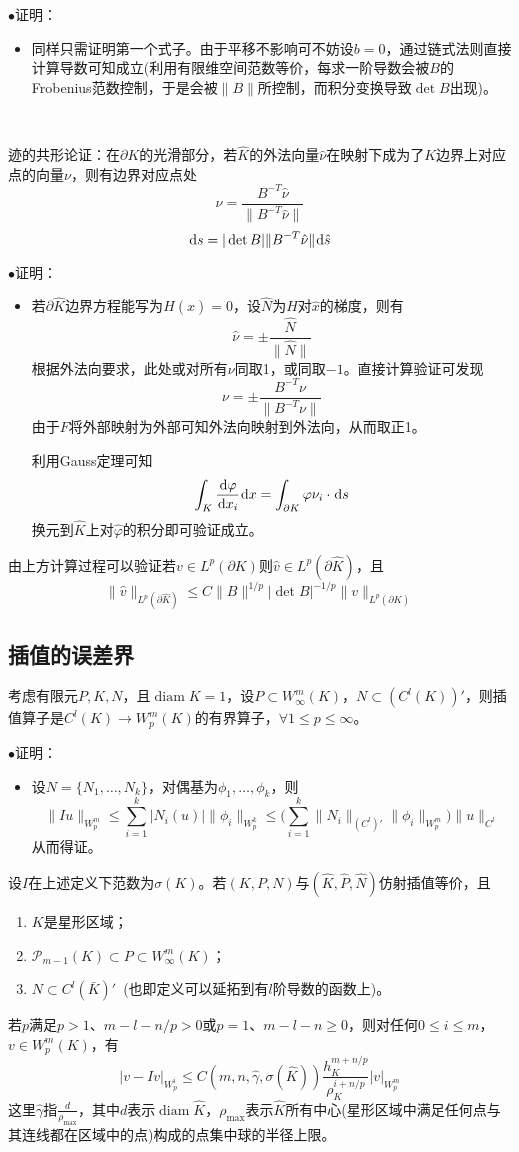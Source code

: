 \documentclass[a4paper,UTF8,fontset=windows]{ctexart}
\newcommand*{\dr}{\hspace{0.07em}\mathrm{d}}
\DeclareMathOperator*{\diam}{diam}
\newcommand*{\cp}{\mathcal{P}}
\newcommand{\proo}[1]{{\kaishu $\bullet$证明：
\begin{itemize}
    \item[] #1
\end{itemize}
}}
\begin{document}
\proo{
    同样只需证明第一个式子。由于平移不影响可不妨设$b=0$，通过链式法则直接计算导数可知成立(利用有限维空间范数等价，每求一阶导数会被$B$的Frobenius范数控制，于是会被$\|B\|$所控制，而积分变换导致$\det B$出现)。
}

\

迹的共形论证：在$\partial K$的光滑部分，若$\hat{K}$的外法向量$\hat\nu$在映射下成为了$K$边界上对应点的向量$\nu$，则有边界对应点处
$$\nu=\frac{B^{-T}\hat\nu}{\|B^{-T}\hat\nu\|}$$
$$\dr s=|\det B|\|B^{-T}\hat\nu\|\dr\hat{s}$$

\proo{
    若$\partial \hat{K}$边界方程能写为$H(\hat{x})=0$，设$\hat{N}$为$H$对$\hat{x}$的梯度，则有
    $$\hat\nu=\pm\frac{\hat{N}}{\|\hat{N}\|}$$
    根据外法向要求，此处或对所有$\nu$同取1，或同取$-1$。直接计算验证可发现
    $$\nu=\pm\frac{B^{-T}\nu}{\|B^{-T}\nu\|}$$
    由于$F$将外部映射为外部可知外法向映射到外法向，从而取正1。

    利用Gauss定理可知
    $$\int_K\frac{\dr\varphi}{\dr x_i}\dr x=\int_{\partial K}\varphi\nu_i\cdot\dr s$$
    换元到$\hat{K}$上对$\hat{\varphi}$的积分即可验证成立。
}

由上方计算过程可以验证若$v\in L^p(\partial K)$则$\hat{v}\in L^p(\partial\hat{K})$，且
$$\|\hat{v}\|_{L^p(\partial\hat{K})}\le C\|B\|^{1/p}|\det B|^{-1/p}\|v\|_{L^p(\partial K)}$$

\subsection{插值的误差界}
考虑有限元$P,K,N$，且$\diam K=1$，设$P\subset W_\infty^m(K)$，$N\subset(C^l(K))'$，则插值算子是$C^l(K)\to W_p^m(K)$的有界算子，$\forall 1\le p\le\infty$。

\proo{
    设$N=\{N_1,\dots,N_k\}$，对偶基为$\phi_1,\dots,\phi_k$，则
    $$\|Iu\|_{W_p^m}\le\sum_{i=1}^k|N_i(u)|\|\phi_i\|_{W_p^k}\le\bigg(\sum_{i=1}^k\|N_i\|_{(C^l)'}\|\phi_i\|_{W_p^m}\bigg)\|u\|_{C^l}$$
    从而得证。
}

设$I$在上述定义下范数为$\sigma(K)$。若$(K,P,N)$与$(\hat{K},\hat{P},\hat{N})$仿射插值等价，且
\begin{enumerate}
    \item $K$是星形区域；
    \item $\cp_{m-1}(K)\subset P\subset W_\infty^m(K)$；
    \item $N\subset C^l(\bar{K})'$\ (也即定义可以延拓到有$l$阶导数的函数上)。
\end{enumerate}

若$p$满足$p>1$、$m-l-n/p>0$或$p=1$、$m-l-n\ge 0$，则对任何$0\le i\le m$，$v\in W_p^m(K)$，有
$$|v-Iv|_{W_p^i}\le C(m,n,\hat{\gamma},\sigma(\hat{K}))\frac{h_K^{m+n/p}}{\rho_K^{i+n/p}}|v|_{W_p^m}$$
这里$\hat{\gamma}$指$\frac{d}{\rho_{\max}}$，其中$d$表示$\diam\hat{K}$，$\rho_{\max}$表示$\hat{K}$所有中心(星形区域中满足任何点与其连线都在区域中的点)构成的点集中球的半径上限。
\end{document}
